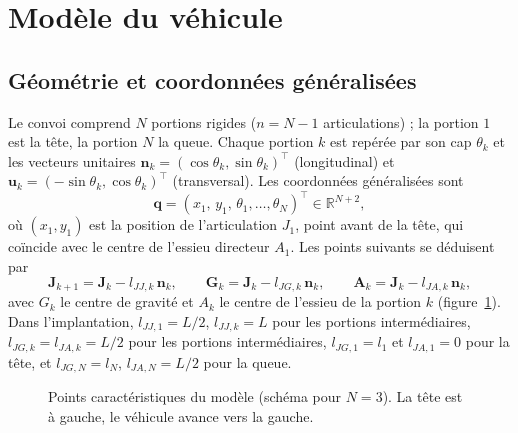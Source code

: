 \documentclass[11pt,a4paper]{article}
\newcommand{\vect}[1]{\bm{#1}}
\newcommand{\T}{^{\!\top}}
\newcommand{\q}{\vect{q}}
\begin{document}
\section{Modèle du véhicule}
\subsection{Géométrie et coordonnées généralisées}
Le convoi comprend $N$ portions rigides ($n=N-1$ articulations) ; la portion $1$ est la tête, la portion $N$ la queue. Chaque portion $k$ est repérée par son cap $\theta_k$ et les vecteurs unitaires $\vect n_k=(\cos\theta_k,\sin\theta_k)\T$ (longitudinal) et $\vect u_k=(-\sin\theta_k,\cos\theta_k)\T$ (transversal). Les coordonnées généralisées sont
\begin{equation}
 \q=(x_1,\,y_1,\,\theta_1,\dots,\theta_N)\T\in\mathbb R^{N+2},
\end{equation}
où $(x_1,y_1)$ est la position de l'articulation $J_1$, point avant de la tête, qui coïncide avec le centre de l'essieu directeur $A_1$. Les points suivants se déduisent par
\begin{equation}
 \vect J_{k+1}=\vect J_k-l_{JJ,k}\,\vect n_k,\qquad
 \vect G_k=\vect J_k-l_{JG,k}\,\vect n_k,\qquad
 \vect A_k=\vect J_k-l_{JA,k}\,\vect n_k,
\end{equation}
avec $G_k$ le centre de gravité et $A_k$ le centre de l'essieu de la portion $k$ (figure~\ref{fig:geom}). Dans l'implantation, $l_{JJ,1}=L/2$, $l_{JJ,k}=L$ pour les portions intermédiaires, $l_{JG,k}=l_{JA,k}=L/2$ pour les portions intermédiaires, $l_{JG,1}=l_1$ et $l_{JA,1}=0$ pour la tête, et $l_{JG,N}=l_N$, $l_{JA,N}=L/2$ pour la queue.

\begin{figure}[H]\centering
{}
\caption{Points caractéristiques du modèle (schéma pour $N=3$). La tête est à gauche, le véhicule avance vers la gauche.}\label{fig:geom}
\end{figure}
\end{document}
